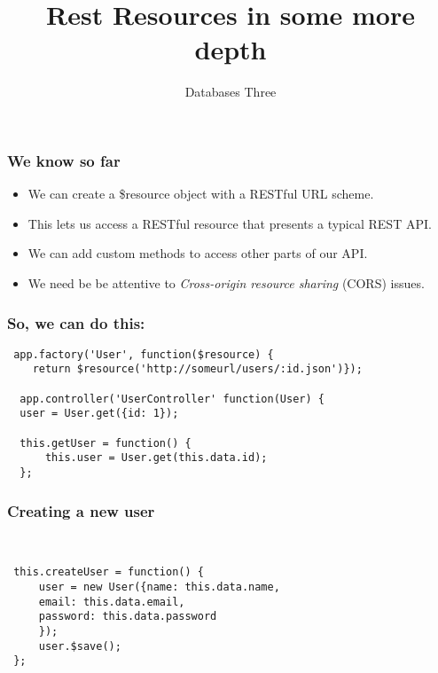 \documentclass[10pt]{beamer}
\title{Rest Resources in some more depth}
\author[IN705]{Databases Three}
\institute[Otago Polytechnic]{
  Otago Polytechnic \\
  Dunedin, New Zealand \\
}
\date{}
\begin{document}
\begin{frame}[plain]
  \titlepage
\end{frame}




\begin{frame}
  \frametitle{We know so far}

 \begin{itemize}
  \item We can create a \$resource object with a RESTful URL scheme.
  \item This lets us access a RESTful resource that presents a typical
        REST API.
  \item We can add custom methods to access other parts of our API.
  \item We need be be attentive to \emph{Cross-origin resource sharing} (CORS) issues.  
 \end{itemize}

\end{frame}


\begin{frame}[fragile]
  \frametitle{So, we can do this:}

 \begin{verbatim}
 app.factory('User', function($resource) {
    return $resource('http://someurl/users/:id.json')});

  app.controller('UserController' function(User) {
  user = User.get({id: 1});

  this.getUser = function() {
      this.user = User.get(this.data.id);
  };

 \end{verbatim}

\end{frame}



\begin{frame}[fragile]
  \frametitle{Creating a new user}

 \begin{verbatim}
  

 this.createUser = function() {
     user = new User({name: this.data.name, 
     email: this.data.email,
     password: this.data.password
     });
     user.$save();
 };
 \end{verbatim}

\end{frame}
\end{document}
